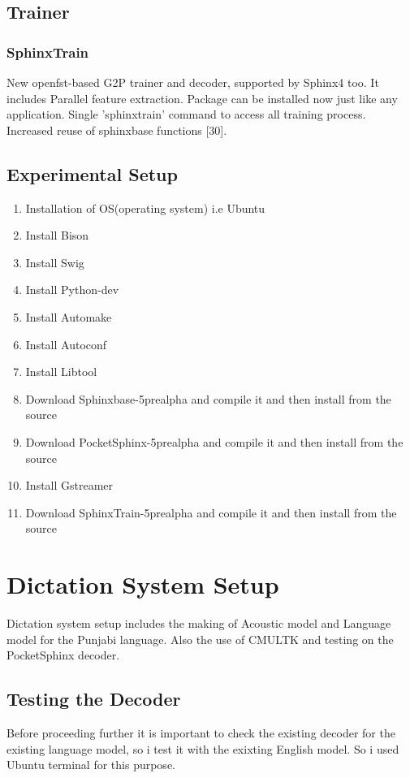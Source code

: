 \documentclass[12pt,a4paper,oneside]{memoir}
\begin{document}
\subsection{Trainer}
\subsubsection{SphinxTrain}
 New openfst-based G2P trainer and decoder, supported by Sphinx4 too. It includes Parallel feature extraction.  Package can be installed now just like any application. Single 'sphinxtrain' command to access all training process. Increased reuse of sphinxbase functions [30].

\subsection{Experimental Setup}

\begin{enumerate}
  \item Installation of OS(operating system) i.e Ubuntu
  \item Install Bison 
  \item Install Swig
  \item Install Python-dev
  \item Install Automake 
  \item Install Autoconf
  \item Install Libtool
  \item Download Sphinxbase-5prealpha and compile it and then install from the source
  \item Download PocketSphinx-5prealpha and compile it and then install from the source
  \item Install Gstreamer  
  \item Download SphinxTrain-5prealpha and compile it and then install from the source	
\end{enumerate}

\section{Dictation System Setup}
Dictation system setup includes the making of Acoustic model and Language model for the Punjabi language. Also the use of CMULTK and testing on the PocketSphinx decoder.

\subsection{Testing the Decoder}
Before proceeding further it is important to check the existing decoder for the existing language model, so i test it with the exixting English model.
So i used Ubuntu terminal for this purpose.\\ 
\end{document}
